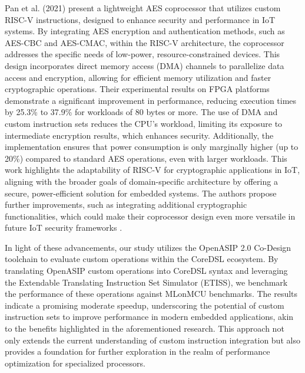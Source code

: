 Pan et al. (2021) present a lightweight AES coprocessor that utilizes custom RISC-V instructions, designed to enhance security and performance in IoT systems. By integrating AES encryption and authentication methods, such as AES-CBC and AES-CMAC, within the RISC-V architecture, the coprocessor addresses the specific needs of low-power, resource-constrained devices. This design incorporates direct memory access (DMA) channels to parallelize data access and encryption, allowing for efficient memory utilization and faster cryptographic operations. Their experimental results on FPGA platforms demonstrate a significant improvement in performance, reducing execution times by 25.3\% to 37.9\% for workloads of 80 bytes or more. The use of DMA and custom instruction sets reduces the CPU's workload, limiting its exposure to intermediate encryption results, which enhances security. Additionally, the implementation ensures that power consumption is only marginally higher (up to 20\%) compared to standard AES operations, even with larger workloads. This work highlights the adaptability of RISC-V for cryptographic applications in IoT, aligning with the broader goals of domain-specific architecture by offering a secure, power-efficient solution for embedded systems. The authors propose further improvements, such as integrating additional cryptographic functionalities, which could make their coprocessor design even more versatile in future IoT security frameworks \cite{pan2021lightweight}.

In light of these advancements, our study utilizes the OpenASIP 2.0 Co-Design toolchain to evaluate custom operations within the CoreDSL ecosystem. By translating OpenASIP custom operations into CoreDSL syntax and leveraging the Extendable Translating Instruction Set Simulator (ETISS), we benchmark the performance of these operations against MLonMCU benchmarks. The results indicate a promising moderate speedup, underscoring the potential of custom instruction sets to improve performance in modern embedded applications, akin to the benefits highlighted in the aforementioned research. This approach not only extends the current understanding of custom instruction integration but also provides a foundation for further exploration in the realm of performance optimization for specialized processors.